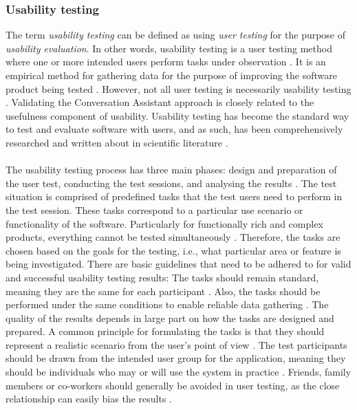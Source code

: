 \documentclass[english, 12pt, a4paper, pdftex, elec, utf8]{aaltothesis}
\begin{document}
\subsubsection{Usability testing} \label{sec:usertesting}

The term \textit{usability testing} can be defined as using \textit{user testing} for the purpose of \textit{usability evaluation}. In other words, usability testing is a user testing method where one or more intended users perform tasks under observation \cite{riihiaho2015}. It is an empirical method for gathering data for the purpose of improving the software product being tested \cite{dumas1999}. However, not all user testing is necessarily usability testing \cite{de2009usability}. Validating the Conversation Assistant approach is closely related to the usefulness component of usability. Usability testing has become the standard way to test and evaluate software with users, and as such, has been comprehensively researched and written about in scientific literature \cite{riihiaho2015, rubin2008handbook, deuff2013user}. \\\\
The usability testing process has three main phases: design and preparation of the user test, conducting the test sessions, and analysing the results \cite{riihiaho2015}. The test situation is comprised of predefined tasks that the test users need to perform in the test session. These tasks correspond to a particular use scenario or functionality of the software. Particularly for functionally rich and complex products, everything cannot be tested simultaneously \cite{dumas1999}. Therefore, the tasks are chosen based on the goals for the testing, i.e., what particular area or feature is being investigated. There are basic guidelines that need to be adhered to for valid and successful usability testing results: The tasks should remain standard, meaning they are the same for each participant \cite{richter2014user}. Also, the tasks should be performed under the same conditions to enable reliable data gathering \cite{riihiaho2015}. The quality of the results depends in large part on how the tasks are designed and prepared. A common principle for formulating the tasks is that they should represent a realistic scenario from the user’s point of view \cite[p.~62]{richter2014user}. The test participants should be drawn from the intended user group for the application, meaning they should be individuals who may or will use the system in practice \cite{riihiaho2015}. Friends, family members or co-workers should generally be avoided in user testing, as the close relationship can easily bias the results \cite[p.~32]{riihiaho2015}. \\\\
\end{document}
